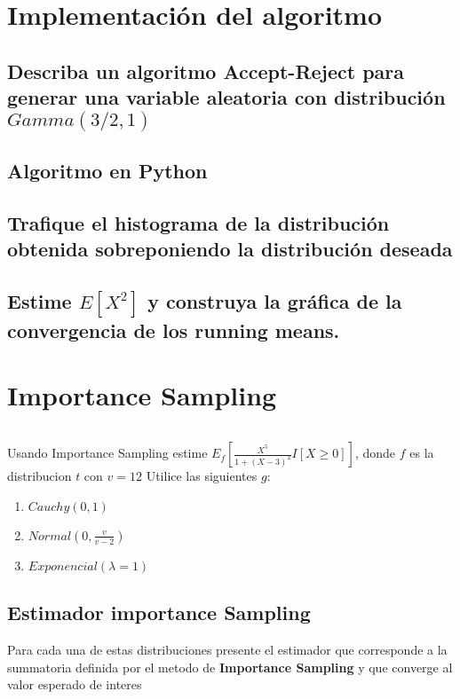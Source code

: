\documentclass{article}
\begin{document}
\section{Implementación del algoritmo}

\subsection{Describa un algoritmo \textbf{Accept-Reject} para generar una variable aleatoria con distribución $Gamma(3/2,1)$}


\subsection{Algoritmo en Python}
\subsection{Trafique el histograma de la distribución obtenida sobreponiendo la distribución deseada}

\subsection{Estime $E[X^2]$ y construya la gráfica de la convergencia de los running means.}

\section{Importance Sampling}

\begin{pythonbox}[title={The function}]
	\inputminted{python}{test.py}
\end{pythonbox}

Usando Importance Sampling estime $E_f\left[ \frac{X^5}{1+(X - 3)^2}I[X \ge 0] \right]$, donde $f$ es la
distribucion $t$ con $v=12$ Utilice las siguientes $g$:
\begin{enumerate}
	\item $Cauchy(0,1)$
	\item $Normal(0, \frac{v}{v-2})$
	\item $Exponencial(\lambda=1)$
\end{enumerate}

\subsection{Estimador importance Sampling}
Para cada una de estas distribuciones presente el estimador que corresponde a la summatoria definida
por el metodo de \textbf{Importance Sampling} y que converge al valor esperado de interes
\end{document}
